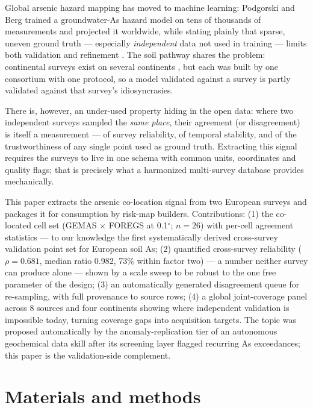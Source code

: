 \documentclass[11pt]{article}
\begin{document}
Global arsenic hazard mapping has moved to machine learning: Podgorski and
Berg trained a groundwater-As hazard model on tens of thousands of
measurements and projected it worldwide, while stating plainly that sparse,
uneven ground truth --- especially \emph{independent} data not used in
training --- limits both validation and refinement \cite{podgorski2020}.
The soil pathway shares the problem: continental surveys exist on several
continents \cite{salminen2005,reimann2014,smith2013}, but each was built by
one consortium with one protocol, so a model validated against a survey is
partly validated against that survey's idiosyncrasies.

There is, however, an under-used property hiding in the open data: where
two independent surveys sampled the \emph{same place}, their agreement (or
disagreement) is itself a measurement --- of survey reliability, of
temporal stability, and of the trustworthiness of any single point used as
ground truth. Extracting this signal requires the surveys to live in one
schema with common units, coordinates and quality flags; that is precisely
what a harmonized multi-survey database provides mechanically.

This paper extracts the arsenic co-location signal from two European
surveys and packages it for consumption by risk-map builders. Contributions:
(1) the co-located cell set (GEMAS $\times$ FOREGS at 0.1$^{\circ}$;
$n{=}26$) with per-cell agreement statistics --- to our knowledge the first
systematically derived cross-survey validation point set for European soil
As;
(2) quantified cross-survey reliability ($\rho{=}0.681$, median ratio
0.982, 73\% within factor two) --- a number neither survey can produce
alone --- shown by a scale sweep to be robust to the one free parameter of
the design;
(3) an automatically generated disagreement queue for re-sampling, with
full provenance to source rows;
(4) a global joint-coverage panel across 8 sources and four continents
showing where independent validation is impossible today, turning coverage
gaps into acquisition targets.
The topic was proposed automatically by the anomaly-replication tier of an
autonomous geochemical data skill after its screening layer flagged
recurring As exceedances; this paper is the validation-side complement.

\section{Materials and methods}
\end{document}
